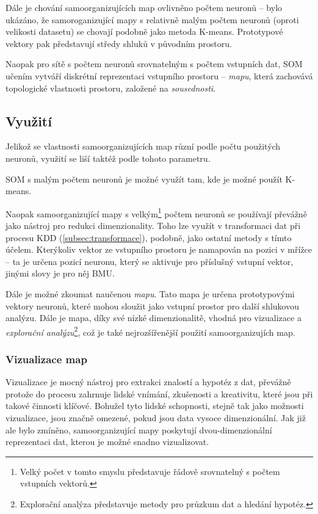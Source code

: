 \documentclass[thesis=M,czech]{FITthesis}[2012/06/26]
\begin{document}
Dále je chování samoorganizujících map ovlivněno počtem neuronů -- bylo ukázáno, že samoroganizující mapy s relativně malým počtem neuronů (oproti velikosti datasetu) se chovají podobně jako metoda K-means\cite{needed}. Prototypové vektory pak  představují středy shluků v původním prostoru.

Naopak pro sítě s počtem neuronů srovnatelným s počtem vstupních dat, SOM učením vytváří diskrétní reprezentaci vstupního prostoru -- \textit{mapu}, která zachovává topologické vlastnosti prostoru, založené na \textit{sousednosti}\cite{cluster_som}.




\subsection{Využití}

Jelikož se vlastnosti samoorganizujících map různí podle počtu použitých neuronů, využití se liší taktéž podle tohoto parametru.

SOM s malým počtem neuronů je možné využít tam, kde je možné použít K-means\cite{needed}.


Naopak samoorganizující mapy s velkým\footnote{Velký počet v tomto smyslu představuje řádově srovnatelný s počtem vstupních vektorů.} počtem neuronů se používají převážně jako nástroj pro redukci dimenzionality.  Toho lze využít v transformaci dat při procesu KDD (\ref{subsec:transformace}), podobně, jako ostatní metody s tímto účelem\cite{som_dim_red}. Kterýkoliv vektor ze vstupního prostoru je namapován na pozici v mřížce -- ta je určena pozicí neuronu, který se aktivuje pro příslušný vstupní vektor, jinými slovy je pro něj BMU.


Dále je možné zkoumat naučenou \textit{mapu}. Tato mapa je určena prototypovými vektory neuronů, které mohou sloužit jako vstupní prostor pro další shlukovou analýzu\cite{som_clustering}. Dále je mapa, díky své nízké dimenzionalitě, vhodná pro vizualizace a 
\textit{explorační analýzu}\footnote{Explorační analýza představuje metody pro průzkum dat a hledání hypotéz.}, což je také nejrozšířenější použití samoorganizujích map.



\subsubsection*{Vizualizace map}
Vizualizace je mocný nástroj pro extrakci znalostí a hypotéz z dat, převážně protože do procesu zahrnuje lidské vnímání, zkušenosti a kreativitu, které jsou při takové činnosti klíčové\cite{visual}. Bohužel tyto lidské schopnosti, stejně tak jako možnosti vizualizace, jsou značně omezené, pokud jsou data vysoce dimenzionální. Jak již ale bylo zmíněno, samoorganizující mapy poskytují dvou-dimenzionální reprezentaci dat, kterou je možné snadno vizualizovat.
\end{document}

